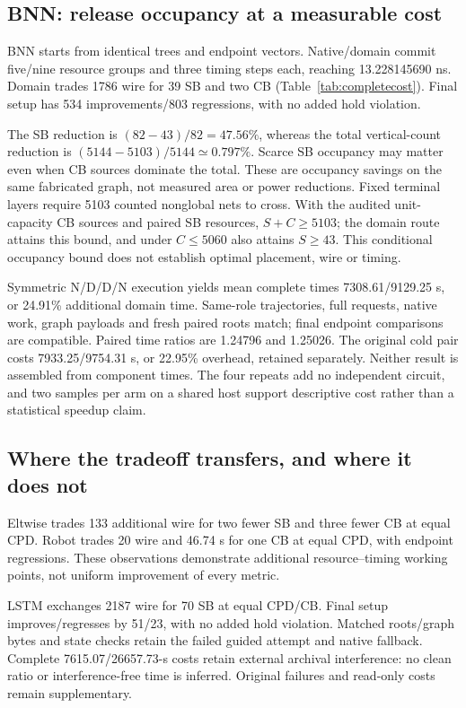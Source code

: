 \documentclass[conference,10pt]{IEEEtran}
\begin{document}
\subsection{BNN: release occupancy at a measurable cost}
BNN starts from identical trees and endpoint vectors. Native/domain commit five/nine resource groups and three timing steps each, reaching 13.228145690 ns. Domain trades 1786 wire for 39 SB and two CB (Table~\ref{tab:completecost}). Final setup has 534 improvements/803 regressions, with no added hold violation.

The SB reduction is $(82-43)/82=47.56\%$, whereas the total vertical-count reduction is $(5144-5103)/5144\simeq0.797\%$. Scarce SB occupancy may matter even when CB sources dominate the total. These are occupancy savings on the same fabricated graph, not measured area or power reductions. Fixed terminal layers require 5103 counted nonglobal nets to cross. With the audited unit-capacity CB sources and paired SB resources, $S+C\ge5103$; the domain route attains this bound, and under $C\le5060$ also attains $S\ge43$. This conditional occupancy bound does not establish optimal placement, wire or timing.

Symmetric N/D/D/N execution yields mean complete times 7308.61/9129.25 s, or 24.91\% additional domain time. Same-role trajectories, full requests, native work, graph payloads and fresh paired roots match; final endpoint comparisons are compatible. Paired time ratios are 1.24796 and 1.25026. The original cold pair costs 7933.25/9754.31 s, or 22.95\% overhead, retained separately. Neither result is assembled from component times. The four repeats add no independent circuit, and two samples per arm on a shared host support descriptive cost rather than a statistical speedup claim.

\subsection{Where the tradeoff transfers, and where it does not}
Eltwise trades 133 additional wire for two fewer SB and three fewer CB at equal CPD. Robot trades 20 wire and 46.74 s for one CB at equal CPD, with endpoint regressions. These observations demonstrate additional resource--timing working points, not uniform improvement of every metric.

LSTM exchanges 2187 wire for 70 SB at equal CPD/CB. Final setup improves/regresses by 51/23, with no added hold violation. Matched roots/graph bytes and state checks retain the failed guided attempt and native fallback. Complete 7615.07/26657.73-s costs retain external archival interference: no clean ratio or interference-free time is inferred. Original failures and read-only costs remain supplementary.
\end{document}
